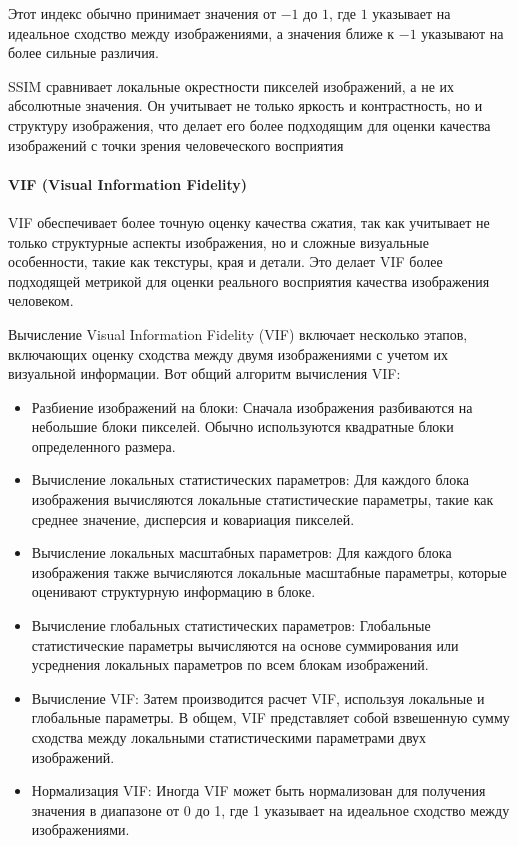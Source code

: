
Этот индекс обычно принимает значения от $-1$ до $1$, где $1$ указывает на
идеальное сходство между изображениями, а значения ближе к $-1$ указывают на
более сильные различия.


SSIM сравнивает локальные окрестности пикселей изображений, а не их абсолютные
значения. Он учитывает не только яркость и контрастность, но и структуру
изображения, что делает его более подходящим для оценки качества изображений с
точки зрения человеческого восприятия


\paragraph{VIF (Visual Information Fidelity)}

VIF обеспечивает более точную оценку качества сжатия, так как учитывает не
только структурные аспекты изображения, но и сложные визуальные особенности,
такие как текстуры, края и детали. Это делает VIF более подходящей метрикой для
оценки реального восприятия качества изображения человеком.


Вычисление Visual Information Fidelity (VIF) включает несколько этапов,
включающих оценку сходства между двумя изображениями с учетом их визуальной
информации. Вот общий алгоритм вычисления VIF:

\begin{itemize}
    \item Разбиение изображений на блоки: Сначала изображения разбиваются на
    небольшие блоки пикселей. Обычно используются квадратные блоки определенного
    размера.
    \item Вычисление локальных статистических параметров: Для каждого блока
    изображения вычисляются локальные статистические параметры, такие как
    среднее значение, дисперсия и ковариация пикселей.
    \item Вычисление локальных масштабных параметров: Для каждого блока
    изображения также вычисляются локальные масштабные параметры, которые
    оценивают структурную информацию в блоке.
    \item Вычисление глобальных статистических параметров: Глобальные
    статистические параметры вычисляются на основе суммирования или усреднения
    локальных параметров по всем блокам изображений.
    \item Вычисление VIF: Затем производится расчет VIF, используя локальные
    и глобальные параметры. В общем, VIF представляет собой взвешенную сумму
    сходства между локальными статистическими параметрами двух изображений.
    \item Нормализация VIF: Иногда VIF может быть нормализован для получения
    значения в диапазоне от 0 до 1, где 1 указывает на идеальное сходство между
    изображениями.
\end{itemize}

